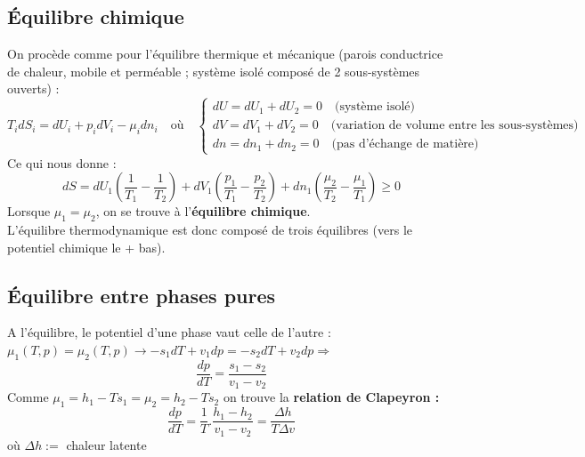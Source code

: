 \documentclass[11pt, a4paper, openany]{book}
\begin{document}
		\subsection{Équilibre chimique}
		On procède comme pour l'équilibre thermique et mécanique (parois conductrice de chaleur, mobile et perméable ; système isolé composé de 2 sous-systèmes ouverts) :
		\begin{equation}
			T_idS_i = dU_i + p_idV_i - \mu_idn_i\quad\text{où}\quad\left\{\begin{array}{l}
			dU = dU_1 + dU_2 = 0\quad\text{(système isolé)}\\
			dV = dV_1 + dV_2 = 0\quad\text{(variation de volume entre les sous-systèmes)}\\
			dn = dn_1 + dn_2 = 0\quad\text{(pas d'échange de matière)}
			\end{array}\right.
		\end{equation}
		Ce qui nous donne : 
		\begin{equation}
			dS = dU_1\left(\frac{1}{T_1}-\frac{1}{T_2}\right) + dV_1 \left(\frac{p_1}{T_1}-\frac{p_2}{T_2}\right) + dn_1\left(\frac{\mu_2}{T_2}-\frac{\mu_1}{T_1}\right) \geq 0
		\end{equation}
		Lorsque $\mu_1 = \mu_2$, on se trouve à l'\textbf{équilibre chimique}.\\
		L'équilibre thermodynamique est donc composé de trois équilibres (vers le potentiel chimique le + bas).
		
		\subsection{Équilibre entre phases pures}
		A l'équilibre, le potentiel d'une phase vaut celle de l'autre : $\mu_1(T, p) = \mu_2(T,p) \rightarrow -s_1dT + v_1dp = -s_2dT + v_2dp \Rightarrow$
		\begin{equation}
			\frac{dp}{dT} = \frac{s_1 - s_2}{v_1 - v_2}
		\end{equation}
		Comme $\mu_1 = h_1 - Ts_1 = \mu_2 = h_2 - Ts_2$ on trouve la \textbf{relation de Clapeyron :}
		\begin{equation}
			\frac{dp}{dT} = \frac{1}{T}.\frac{h_1 - h_2}{v_1 - v_2} = \frac{\Delta h}{T\Delta v}
		\end{equation}
		où $\Delta h:=$ chaleur latente
\end{document}
